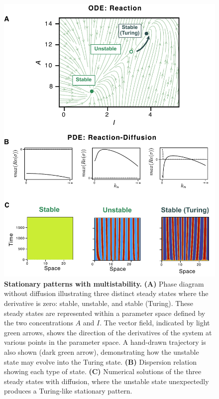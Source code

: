 \begin{figure}[H]
    \includegraphics[width=1\textwidth]{figures/multistability1}

    \caption{\textbf{Stationary patterns with multistability.} \textbf{(A)} Phase diagram without diffusion illustrating three distinct steady states where the derivative is zero: stable, unstable, and stable (Turing). These steady states are represented within a parameter space defined by the two concentrations $A$ and $I$. The vector field, indicated by light green arrows, shows the direction of the derivatives of the system at various points in the parameter space. A hand-drawn trajectory is also shown (dark green arrow), demonstrating how the unstable state may evolve into the Turing state. \textbf{(B)} Dispersion relation showing each type of state. \textbf{(C)} Numerical solutions of the three steady states with diffusion, where the unstable state unexpectedly produces a Turing-like stationary pattern. }
    \label{fig:multistability1}
\end{figure}


